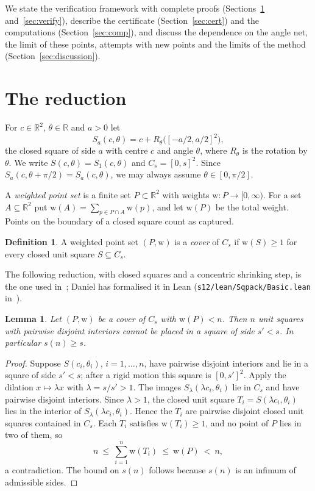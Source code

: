 \documentclass[11pt]{amsart}
\newtheorem{lemma}[theorem]{Lemma}
\theoremstyle{definition}
\newtheorem{definition}[theorem]{Definition}
\theoremstyle{remark}
\newcommand{\R}{\mathbb{R}}
\newcommand{\Cs}{C_s}
\newcommand{\wt}{\mathrm{w}}
\begin{document}
We state the verification framework with complete proofs (Sections~\ref{sec:reduction} and~\ref{sec:verify}), describe the certificate (Section~\ref{sec:cert}) and the computations (Section~\ref{sec:comp}), and discuss the dependence on the angle net, the limit of these points, attempts with new points and the limits of the method (Section~\ref{sec:discussion}).

\section{The reduction}\label{sec:reduction}

For $c\in\R^2$, $\theta\in\R$ and $a>0$ let
\[
  S_a(c,\theta) = c + R_\theta\bigl([-a/2,a/2]^2\bigr),
\]
the closed square of side $a$ with centre $c$ and angle $\theta$, where $R_\theta$ is the rotation by $\theta$. We write $S(c,\theta)=S_1(c,\theta)$ and $\Cs=[0,s]^2$. Since $S_a(c,\theta+\pi/2)=S_a(c,\theta)$, we may always assume $\theta\in[0,\pi/2]$.

A \emph{weighted point set} is a finite set $P\subset\R^2$ with weights $\wt\colon P\to[0,\infty)$. For a set $A\subseteq\R^2$ put $\wt(A)=\sum_{p\in P\cap A}\wt(p)$, and let $\wt(P)$ be the total weight. Points on the boundary of a closed square count as captured.

\begin{definition}
A weighted point set $(P,\wt)$ is a \emph{cover} of $\Cs$ if $\wt(S)\ge 1$ for every closed unit square $S\subseteq\Cs$.
\end{definition}

The following reduction, with closed squares and a concentric shrinking step, is the one used in~\cite{Bur26,Mas26a,Dan26}; Daniel has formalised it in Lean (\texttt{s12/lean/Sqpack/Basic.lean} in~\cite{Dan26}).

\begin{lemma}\label{lem:reduction}
Let $(P,\wt)$ be a cover of $\Cs$ with $\wt(P)<n$. Then $n$ unit squares with pairwise disjoint interiors cannot be placed in a square of side $s'<s$. In particular $s(n)\ge s$.
\end{lemma}

\begin{proof}
Suppose $S(c_i,\theta_i)$, $i=1,\dots,n$, have pairwise disjoint interiors and lie in a square of side $s'<s$; after a rigid motion this square is $[0,s']^2$. Apply the dilation $x\mapsto\lambda x$ with $\lambda=s/s'>1$. The images $S_\lambda(\lambda c_i,\theta_i)$ lie in $\Cs$ and have pairwise disjoint interiors. Since $\lambda>1$, the closed unit square $T_i=S(\lambda c_i,\theta_i)$ lies in the interior of $S_\lambda(\lambda c_i,\theta_i)$. Hence the $T_i$ are pairwise disjoint closed unit squares contained in $\Cs$. Each $T_i$ satisfies $\wt(T_i)\ge1$, and no point of $P$ lies in two of them, so
\[
  n\ \le\ \sum_{i=1}^n \wt(T_i)\ \le\ \wt(P)\ <\ n,
\]
a contradiction. The bound on $s(n)$ follows because $s(n)$ is an infimum of admissible sides.
\end{proof}
\end{document}
